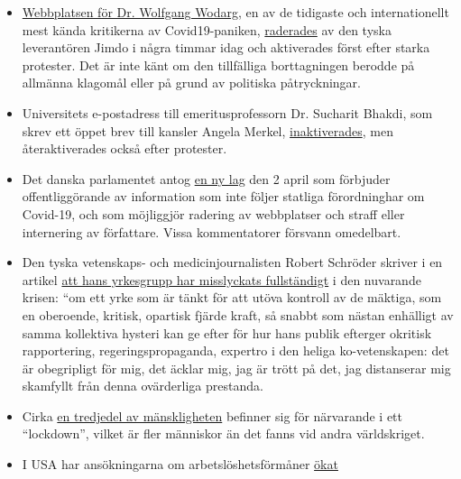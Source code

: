 \begin{itemize}
\tightlist
\item
  \href{http://wodarg.com/}{Webbplatsen för Dr. Wolfgang Wodarg}, en av
  de tidigaste och internationellt mest kända kritikerna av
  Covid19-paniken, \href{https://twitter.com/wodarg}{raderades} av den
  tyska leverantören Jimdo i några timmar idag och aktiverades först
  efter starka protester. Det är inte känt om den tillfälliga
  borttagningen berodde på allmänna klagomål eller på grund av politiska
  påtryckningar.
\item
  Universitets e-postadress till emeritusprofessorn Dr. Sucharit Bhakdi,
  som skrev ett öppet brev till kansler Angela Merkel,
  \href{https://swprs.org/offener-brief-von-professor-sucharit-bhakdi-an-bundeskanzlerin-dr-angela-merkel/}{inaktiverades},
  men återaktiverades också efter protester.
\item
  Det danska parlamentet antog
  \href{https://newsvoice.se/2020/04/danmark-forbjuder-corona-policy/}{en
  ny lag} den 2 april som förbjuder offentliggörande av information som
  inte följer statliga förordninghar om Covid-19, och som möjliggjör
  radering av webbplatser och straff eller internering av författare.
  Vissa kommentatorer försvann omedelbart.
\item
  Den tyska vetenskaps- och medicinjournalisten Robert Schröder skriver
  i en artikel
  \href{https://www.nachrichten-fabrik.de/news/harald-wiesendanger-ueber-die-massenmedien-waehrend-der-corona-krise-ich-schaeme-mich---meines-berufsstands-152103}{att
  hans yrkesgrupp har misslyckats fullständigt} i den nuvarande krisen:
  ``om ett yrke som är tänkt för att utöva kontroll av de mäktiga, som
  en oberoende, kritisk, opartisk fjärde kraft, så snabbt som nästan
  enhälligt av samma kollektiva hysteri kan ge efter för hur hans publik
  efterger okritisk rapportering, regeringspropaganda, expertro i den
  heliga ko-vetenskapen: det är obegripligt för mig, det äcklar mig, jag
  är trött på det, jag distanserar mig skamfyllt från denna ovärderliga
  prestanda.
\item
  Cirka
  \href{https://www.sciencealert.com/one-third-of-the-world-s-population-are-now-restricted-in-where-they-can-go}{en
  tredjedel av mänskligheten} befinner sig för närvarande i ett
  ``lockdown'', vilket är fler människor än det fanns vid andra
  världskriget.
\item
  I USA har ansökningarna om arbetslöshetsförmåner
  \href{https://www.reuters.com/article/us-health-coronavirus-usa-layoffs/us-weekly-jobless-claims-seen-at-record-high-again-idUSKBN21K0FX}{ökat
}
\end{itemize}

